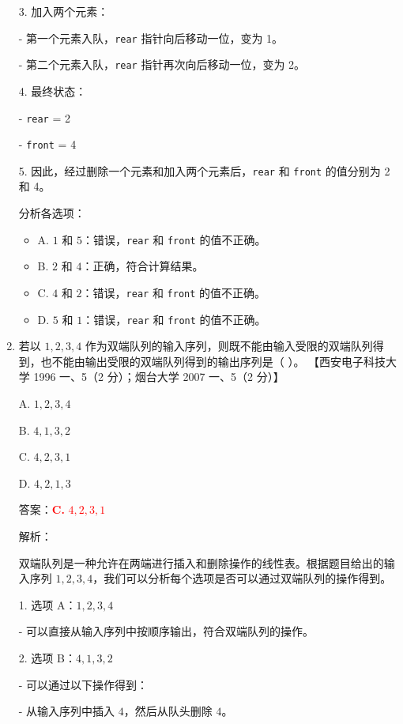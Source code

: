 \documentclass[lang=cn,newtx,10pt,scheme=chinese]{../../../elegantbook}
\begin{document}
\begin{enumerate}
    3. 加入两个元素：

         - 第一个元素入队，\texttt{rear} 指针向后移动一位，变为 1。

         - 第二个元素入队，\texttt{rear} 指针再次向后移动一位，变为 2。

    4. 最终状态：

         - \texttt{rear} = 2

         - \texttt{front} = 4

    5. 因此，经过删除一个元素和加入两个元素后，\texttt{rear} 和 \texttt{front} 的值分别为 2 和 4。

    分析各选项：
    \begin{itemize}
        \item A. $1$ 和 $5$：错误，\texttt{rear} 和 \texttt{front} 的值不正确。
        
        \item B. $2$ 和 $4$：正确，符合计算结果。
        
        \item C. $4$ 和 $2$：错误，\texttt{rear} 和 \texttt{front} 的值不正确。
        
        \item D. $5$ 和 $1$：错误，\texttt{rear} 和 \texttt{front} 的值不正确。
    \end{itemize}
    \item 若以 $1, 2, 3, 4$ 作为双端队列的输入序列，则既不能由输入受限的双端队列得到，也不能由输出受限的双端队列得到的输出序列是（ ）。  
    【西安电子科技大学 1996 一、5（2 分）；烟台大学 2007 一、5（2 分）】  

    A. $1, 2, 3, 4$  

    B. $4, 1, 3, 2$  

    C. $4, 2, 3, 1$  

    D. $4, 2, 1, 3$  

    答案：\textcolor{red}{\textbf{C.} $4, 2, 3, 1$}

    解析：

    双端队列是一种允许在两端进行插入和删除操作的线性表。根据题目给出的输入序列 $1, 2, 3, 4$，我们可以分析每个选项是否可以通过双端队列的操作得到。

    1. 选项 A：$1, 2, 3, 4$  

       - 可以直接从输入序列中按顺序输出，符合双端队列的操作。

    2. 选项 B：$4, 1, 3, 2$

       - 可以通过以下操作得到：

         - 从输入序列中插入 $4$，然后从队头删除 $4$。


\end{enumerate}
\end{document}

